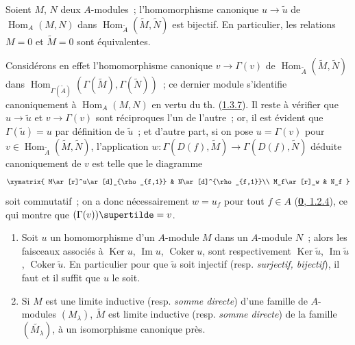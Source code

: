 \begin{corollary}[1.3.8]
\label{I.1.3.8-fr}
Soient $M$, $N$ deux $A$-modules~; l'homomorphisme canonique
$u\to\widetilde{u}$ de $\operatorname{Hom}_A(M,N)$ dans
$\operatorname{Hom}_{\widetilde{A}}(\widetilde{M},\widetilde{N})$ est
bijectif. En particulier, les relations $M=0$ et $\widetilde{M}=0$ sont
équivalentes.
\end{corollary}

Considérons en effet l'homomorphisme canonique $v\to\Gamma(v)$ de
$\operatorname{Hom}_{\widetilde{A}}(\widetilde{M},\widetilde{N})$ dans
$\operatorname{Hom}_{\Gamma(\widetilde{A})}
(\Gamma(\widetilde{M}),\Gamma(\widetilde{N}))$~; ce dernier module s'identifie
canoniquement à $\operatorname{Hom}_A(M,N)$ en vertu du th.
(\hyperref[I.1.3.7-fr]{1.3.7}). Il reste à vérifier que
$u\to\widetilde{u}$ et $v\to\Gamma(v)$ sont réciproques l'un de
l'autre~; or, il est évident que $\Gamma(\widetilde{u})=u$ par définition de
$\widetilde{u}$~; et d'autre part, si on pose $u=\Gamma(v)$ pour
$v\in\operatorname{Hom}_{\widetilde{A}}(\widetilde{M},\widetilde{N})$,
l'application
$w:\Gamma(D(f),\widetilde{M})\to\Gamma(D(f),\widetilde{N})$ déduite
canoniquement de $v$ est telle que le diagramme
\[
  \xymatrix{
    M\ar[r]^u\ar[d]_{\rho_{f,1}} & N\ar[d]^{\rho_{f,1}}\\
    M_f\ar[r]_w & N_f
  }
\]
soit commutatif~; on a donc nécessairement $w=u_f$ pour tout $f\in A$
(\hyperref[0.1.2.4-fr]{\textbf{0}, 1.2.4}), ce qui montre que
$(\Gamma(v))\supertilde=v$.

\begin{corollary}[1.3.9]
\label{I.1.3.9-fr}
\begin{enumerate}
  \item[\rm(i)] Soit $u$ un homomorphisme d'un $A$-module $M$ dans un
  $A$-module $N$~; alors les faisceaux associés à $\operatorname{Ker}u$,
  $\operatorname{Im}u$, $\operatorname{Coker}u$, sont respectivement
  $\operatorname{Ker}\widetilde{u}$, $\operatorname{Im}\widetilde{u}$,
  $\operatorname{Coker}\widetilde{u}$. En particulier pour que
  $\widetilde{u}$ soit injectif \textup{(resp. \emph{surjectif, bijectif})}, il faut et il
  suffit que $u$ le soit.
  \item[\rm(ii)] Si $M$ est une limite inductive \textup{(resp. \emph{somme directe})} d'une
  famille de $A$-modules $(M_\lambda)$, $\widetilde{M}$ est limite inductive
  \textup{(resp. \emph{somme directe})} de la famille $(\widetilde{M_\lambda})$, à un
  isomorphisme canonique près.
\end{enumerate}
\end{corollary}

